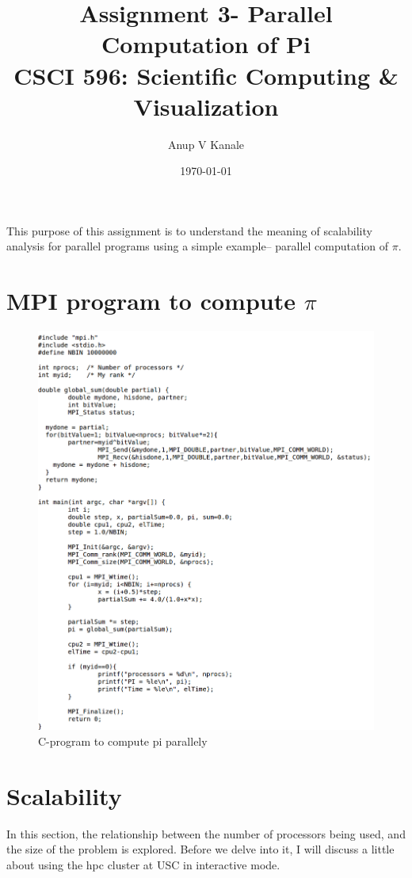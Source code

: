 \documentclass[11pt, oneside]{article}   	%
\title{\vspace{-6ex} Assignment 3- Parallel Computation of Pi \\ {CSCI 596: Scientific Computing \& Visualization}  \vspace{-2ex}}
\author{Anup V Kanale}
\date{\vspace{-2ex}\today}							%
\begin{document}
\maketitle \vspace{-5ex}

This purpose of this assignment is to understand the meaning of scalability analysis for parallel programs using a simple example-- parallel computation of $\pi$.

\vspace{-2ex} \section{MPI program to compute $\pi$}
\begin{figure}[!htbp]
	\centering
	\includegraphics[scale=0.2]{C-code.png}
	\caption{C-program to compute pi parallely}
\end{figure}

\vspace{-2ex} \section{Scalability}
In this section, the relationship between the number of processors being used, and the size of the problem is explored. Before we delve into it, I will discuss a little about using the hpc cluster at USC in interactive mode.
\end{document}
